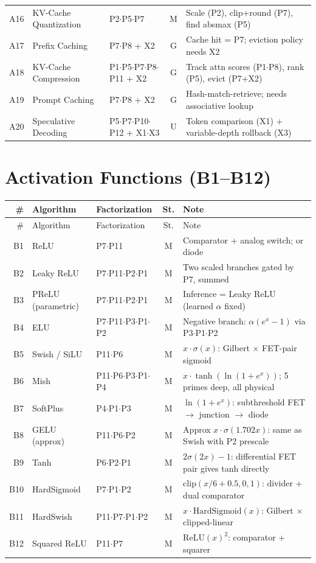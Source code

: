 \documentclass[10pt]{article}
\begin{document}
\begin{longtable}{rlp{3.0cm}cp{4.8cm}}
A16 & KV-Cache Quantization & P2$\cdot$P5$\cdot$P7 & M & Scale (P2), clip+round (P7), find absmax (P5) \\
A17 & Prefix Caching & P7$\cdot$P8 + X2 & G & Cache hit = P7; eviction policy needs X2 \\
A18 & KV-Cache Compression & P1$\cdot$P5$\cdot$P7$\cdot$P8$\cdot$P11 + X2 & G & Track attn scores (P1$\cdot$P8), rank (P5), evict (P7+X2) \\
A19 & Prompt Caching & P7$\cdot$P8 + X2 & G & Hash-match-retrieve; needs associative lookup \\
A20 & Speculative Decoding & P5$\cdot$P7$\cdot$P10$\cdot$P12 + X1$\cdot$X3 & U & Token comparison (X1) + variable-depth rollback (X3) \\
\end{longtable}

\section{Activation Functions (B1--B12)}

\begin{longtable}{rlp{3.0cm}cp{4.8cm}}
\toprule
\# & Algorithm & Factorization & St. & Note \\
\midrule
\endfirsthead
\toprule
\# & Algorithm & Factorization & St. & Note \\
\midrule
\endhead
\bottomrule
\endfoot
B1 & ReLU & P7$\cdot$P11 & M & Comparator + analog switch; or diode \\
B2 & Leaky ReLU & P7$\cdot$P11$\cdot$P2$\cdot$P1 & M & Two scaled branches gated by P7, summed \\
B3 & PReLU (parametric) & P7$\cdot$P11$\cdot$P2$\cdot$P1 & M & Inference = Leaky ReLU (learned $\alpha$ fixed) \\
B4 & ELU & P7$\cdot$P11$\cdot$P3$\cdot$P1$\cdot$P2 & M & Negative branch: $\alpha(e^x-1)$ via P3$\cdot$P1$\cdot$P2 \\
B5 & Swish / SiLU & P11$\cdot$P6 & M & $x \cdot \sigma(x)$: Gilbert $\times$ FET-pair sigmoid \\
B6 & Mish & P11$\cdot$P6$\cdot$P3$\cdot$P1$\cdot$P4 & M & $x \cdot \tanh(\ln(1+e^x))$; 5 primes deep, all physical \\
B7 & SoftPlus & P4$\cdot$P1$\cdot$P3 & M & $\ln(1+e^x)$: subthreshold FET $\to$ junction $\to$ diode \\
B8 & GELU (approx) & P11$\cdot$P6$\cdot$P2 & M & Approx $x \cdot \sigma(1.702x)$: same as Swish with P2 prescale \\
B9 & Tanh & P6$\cdot$P2$\cdot$P1 & M & $2\sigma(2x)-1$: differential FET pair gives tanh directly \\
B10 & HardSigmoid & P7$\cdot$P1$\cdot$P2 & M & $\mathrm{clip}(x/6+0.5,0,1)$: divider + dual comparator \\
B11 & HardSwish & P11$\cdot$P7$\cdot$P1$\cdot$P2 & M & $x \cdot \mathrm{HardSigmoid}(x)$: Gilbert $\times$ clipped-linear \\
B12 & Squared ReLU & P11$\cdot$P7 & M & $\mathrm{ReLU}(x)^2$: comparator + squarer \\
\end{longtable}
\end{document}
